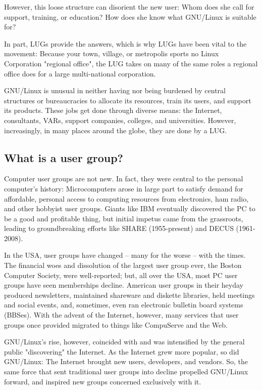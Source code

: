 \documentclass{HOWTO}
\begin{document}
However, this loose structure can disorient the new user: Whom
does she call for support, training, or education? How does she know
what GNU/Linux is suitable for?

In part, LUGs provide the answers, which is why LUGs have been vital to
the movement: Because your town, village, or metropolis sports no
Linux Corporation "regional office", the LUG takes on many of the same
roles a regional office does for a large multi-national corporation.

GNU/Linux is unusual in neither having nor being burdened by central
structures or bureaucracies to allocate its resources, train its users,
and support its products. These jobs get done through diverse means: the
Internet, consultants, VARs, support companies, colleges, and
universities. However, increasingly, in many places around the globe,
they are done by a LUG.




\subsection{What is a user group?}

Computer user groups are not new. In
fact, they were central to the personal computer's history:
Microcomputers arose in large part to satisfy demand for affordable,
personal access to computing resources from electronics, ham radio, and
other hobbyist user groups.  Giants like IBM eventually discovered the
PC to be a good and profitable thing, but initial impetus came from the
grassroots, leading to groundbreaking efforts like SHARE (1955-present) 
and DECUS (1961-2008).

In the USA, user groups have changed -- many for the worse --
with the times. The financial woes and dissolution of the largest user
group ever, the Boston Computer Society, were well-reported; but, all
over the USA, most PC user groups have seen memberships decline.
American user groups in their heyday produced newsletters, maintained
shareware and diskette libraries, held meetings and social events, and,
sometimes, even ran electronic bulletin board systems (BBSes). With the
advent of the Internet, however, many services that user groups once
provided migrated to things like CompuServe and the Web.

GNU/Linux's rise, however, coincided with and was intensified by the
general public "discovering" the Internet. As the Internet grew more
popular, so did GNU/Linux: The Internet brought new users,
developers, and vendors. So, the same force that sent traditional user
groups into decline propelled GNU/Linux forward, and inspired new groups 
concerned exclusively with it. 
\end{document}
